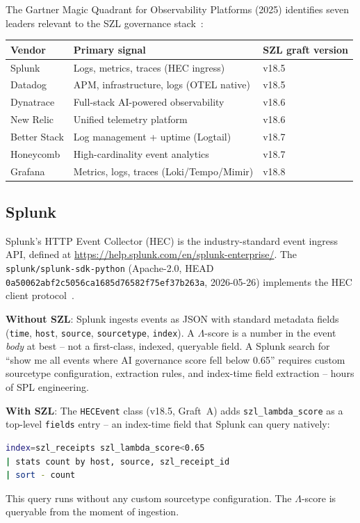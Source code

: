 The Gartner Magic Quadrant for Observability Platforms (2025) identifies
seven leaders relevant to the SZL governance stack~\cite{splunk_datadog_deep,
dynatrace_newrelic_deep,better_stack_honeycomb_deep}:

\begin{center}
\begin{tabular}{lll}
\textbf{Vendor} & \textbf{Primary signal} & \textbf{SZL graft version} \\
\hline
Splunk & Logs, metrics, traces (HEC ingress) & v18.5 \\
Datadog & APM, infrastructure, logs (OTEL native) & v18.5 \\
Dynatrace & Full-stack AI-powered observability & v18.6 \\
New Relic & Unified telemetry platform & v18.6 \\
Better Stack & Log management + uptime (Logtail) & v18.7 \\
Honeycomb & High-cardinality event analytics & v18.7 \\
Grafana & Metrics, logs, traces (Loki/Tempo/Mimir) & v18.8 \\
\end{tabular}
\end{center}

\subsection{Splunk}
\label{ssec:splunk}

Splunk's HTTP Event Collector (HEC) is the industry-standard event ingress
API, defined at \url{https://help.splunk.com/en/splunk-enterprise/}.  The
\texttt{splunk/splunk-sdk-python} (Apache-2.0, HEAD
\texttt{0a50062abf2c5056ca1685d76582f75ef37b263a}, 2026-05-26) implements
the HEC client protocol~\cite{szl_observability_graft}.

\textbf{Without SZL}: Splunk ingests events as JSON with standard metadata
fields (\texttt{time}, \texttt{host}, \texttt{source}, \texttt{sourcetype},
\texttt{index}).  A $\Lambda$-score is a number in the event \emph{body} at
best -- not a first-class, indexed, queryable field.  A Splunk search for
``show me all events where AI governance score fell below 0.65'' requires
custom sourcetype configuration, extraction rules, and index-time field
extraction -- hours of SPL engineering.

\textbf{With SZL}: The \texttt{HECEvent} class (v18.5, Graft~A) adds
\texttt{szl\_lambda\_score} as a top-level \texttt{fields} entry -- an
index-time field that Splunk can query natively:
\begin{lstlisting}[language=bash, caption={Splunk SPL query on SZL
  Lambda field}, label={lst:splunk-spl}]
index=szl_receipts szl_lambda_score<0.65
| stats count by host, source, szl_receipt_id
| sort - count
\end{lstlisting}
This query runs without any custom sourcetype configuration.  The $\Lambda$-score
is queryable from the moment of ingestion.

